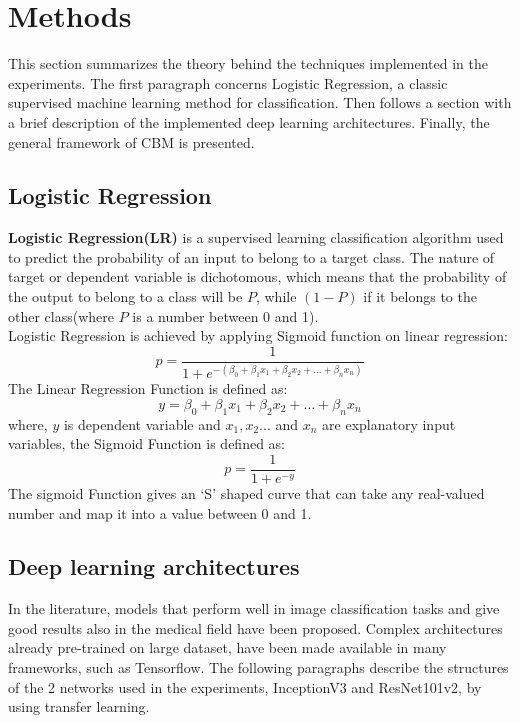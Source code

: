 \graphicspath{{chapters/chapter4/}}
\chapter{Methods} \label{chapter3}

This section summarizes the theory behind the techniques implemented in the experiments.  The first paragraph concerns Logistic Regression, a classic supervised machine learning method for classification. Then follows a section with a brief description of the implemented deep learning architectures.  Finally, the general framework of CBM is presented.
\section{Logistic Regression}
\textbf{Logistic Regression(LR)} is a supervised learning classification algorithm used to predict the probability of an input to belong to a target class. The nature of target or dependent variable is dichotomous, which means that the probability of the output to belong to a class will be $P$, while $(1-P)$ if it belongs to the other class(where $P$ is a number between 0 and 1).\\ 
Logistic Regression is achieved by applying Sigmoid function on linear regression:
\begin{equation}
p = \frac{1}{1 + e^{-(\beta_0 + \beta_1 x_1 + \beta_2 x_2 + ... +\beta_n x_n)}    }
\label{LReq}
\end{equation}
The Linear Regression Function is defined as:
\begin{equation}
y = \beta_0 + \beta_1 x_1 + \beta_2 x_2 + ... +\beta_n x_n
\end{equation}
where, $y$ is dependent variable and $x_1, x_2 ...$ and $x_n$ are explanatory input variables, the Sigmoid Function is defined as: 
\begin{equation}
p = \frac{1}{1+e^{-y}}
\end{equation}
The sigmoid Function gives an ‘S’ shaped curve that can take any real-valued number and map it into a value between 0 and 1.
\section{Deep learning architectures}
In the literature, models that perform well in image classification tasks and give good results also in the medical field have been proposed. Complex architectures already pre-trained on large dataset, have been made available in many frameworks, such as Tensorflow\cite{tensorflow2015-whitepaper}.
The following paragraphs describe the structures of the 2 networks used in the experiments, InceptionV3 and ResNet101v2, by using transfer learning.
